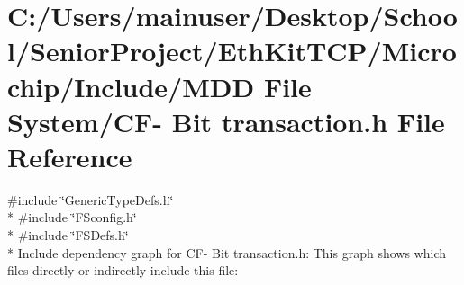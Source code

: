 \hypertarget{_c_f-_01_bit_01transaction_8h}{}\section{C\+:/\+Users/mainuser/\+Desktop/\+School/\+Senior\+Project/\+Eth\+Kit\+T\+C\+P/\+Microchip/\+Include/\+M\+D\+D File System/\+C\+F-\/ Bit transaction.\+h File Reference}
\label{_c_f-_01_bit_01transaction_8h}
{\ttfamily \#include \char`\"{}Generic\+Type\+Defs.\+h\char`\"{}}\\*
{\ttfamily \#include \char`\"{}F\+Sconfig.\+h\char`\"{}}\\*
{\ttfamily \#include \char`\"{}F\+S\+Defs.\+h\char`\"{}}\\*
Include dependency graph for C\+F-\/ Bit transaction.\+h\+:
This graph shows which files directly or indirectly include this file\+:
